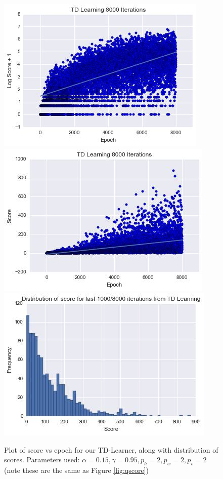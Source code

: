 \documentclass[letterpaper]{article}
\begin{document}
\begin{figure}
\centering
\includegraphics[scale=0.65]{TDQ_8000_log}
\includegraphics[scale=0.65]{TDQ_8000_score}
\includegraphics[scale=0.65]{TDQ_8000_distribution}
\caption{Plot of score vs epoch for our TD-Learner, along with distribution of scores. Parameters used: $\alpha = 0.15, \gamma = 0.95, p_h = 2, p_w = 2,p_v = 2$ (note these are the same as Figure \ref{fig:qscore})}
\label{fig:tdqscore}
\end{figure}
\end{document}
